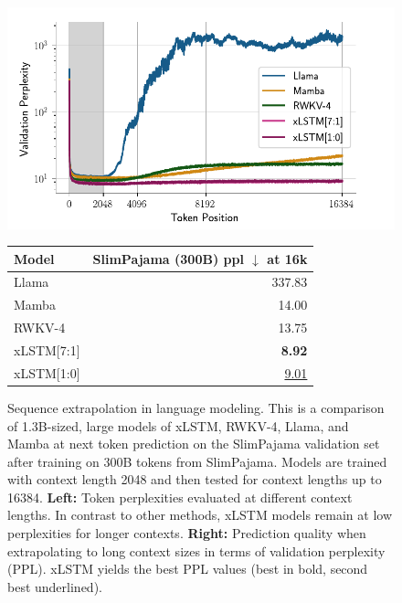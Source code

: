 \documentclass[dvipsnames]{article}
\newcommand{\first}[1]{\textbf{#1}}
\newcommand{\scd}[1]{\underline{#1}}
\begin{document}
\begin{figure}[htbp]
    \vspace{-0.4cm}
    \centering
    \begin{minipage}{0.69\textwidth}
    \hspace{-1em}
    \includegraphics[width=1.15\textwidth]{figures/plot_spaj300b_sequence_extrapolation.pdf}    
    \end{minipage}
    \hfill
    \begin{minipage}{0.27\textwidth}
         \centering
         \vspace{-0.7em}
         \begin{adjustbox}{width=\textwidth}
        \begin{tabular}{lr}
            \toprule
            \vspace{0.1em}
            Model & \thead{SlimPajama  \\ (300B) ppl $\downarrow$ \\ at 16k} \\
            \midrule
            Llama & 337.83 \\
            Mamba & 14.00 \\
            RWKV-4 & 13.75 \\
            xLSTM[7:1] & \first{8.92} \\
            xLSTM[1:0] & \scd{9.01} \\
            \bottomrule
        \end{tabular}
        \end{adjustbox}
    \end{minipage}
    \caption{Sequence extrapolation in language modeling. 
    This is a comparison of 1.3B-sized, large models of xLSTM, RWKV-4, Llama, and Mamba
    at next token prediction on the SlimPajama validation set after
    training on 300B tokens from SlimPajama. 
    Models are trained with context length 2048 
    and then tested for context lengths up to 16384.
    \textbf{Left:} 
    Token perplexities evaluated at different context lengths. 
    In contrast to other methods, 
    xLSTM models remain at low perplexities for longer contexts.
    \textbf{Right:} Prediction quality when
    extrapolating to long context sizes in terms of validation
    perplexity (PPL). xLSTM yields the best PPL values (best in bold, second best underlined).
    \label{fig:spaj300B_seq_extrapolation}
   }
\end{figure}
\end{document}
